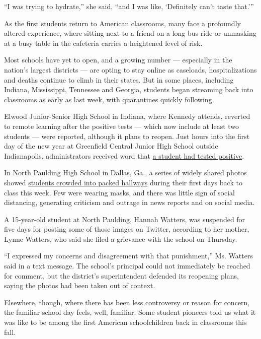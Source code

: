 ``I was trying to hydrate,'' she said, ``and I was like, `Definitely
can't taste that.'''

As the first students return to American classrooms, many face a
profoundly altered experience, where sitting next to a friend on a long
bus ride or unmasking at a busy table in the cafeteria carries a
heightened level of risk.

Most schools have yet to open, and a growing number --- especially in
the nation's largest districts --- are opting to stay online as
caseloads, hospitalizations and deaths continue to climb in their
states. But in some places, including Indiana, Mississippi, Tennessee
and Georgia, students began streaming back into classrooms as early as
last week, with quarantines quickly following.

Elwood Junior-Senior High School in Indiana, where Kennedy attends,
reverted to remote learning after the positive tests --- which now
include at least two students --- were reported, although it plans to
reopen. Just hours into the first day of the new year at Greenfield
Central Junior High School outside Indianapolis, administrators received
word that
\href{https://www.nytimes3xbfgragh.onion/2020/08/01/us/schools-reopening-indiana-coronavirus.html}{a
student had tested positive}.

In North Paulding High School in Dallas, Ga., a series of widely shared
photos showed
\href{https://www.nytimes3xbfgragh.onion/2020/08/06/us/north-paulding-high-school-coronavirus-georgia.html}{students
crowded into packed hallways} during their first days back to class this
week. Few were wearing masks, and there was little sign of social
distancing, generating criticism and outrage in news reports and on
social media.

A 15-year-old student at North Paulding, Hannah Watters, was suspended
for five days for posting some of those images on Twitter, according to
her mother, Lynne Watters, who said she filed a grievance with the
school on Thursday.

``I expressed my concerns and disagreement with that punishment,'' Ms.
Watters said in a text message. The school's principal could not
immediately be reached for comment, but the district's superintendent
defended its reopening plans, saying the photos had been taken out of
context.

Elsewhere, though, where there has been less controversy or reason for
concern, the familiar school day feels, well, familiar. Some student
pioneers told us what it was like to be among the first American
schoolchildren back in classrooms this fall.

